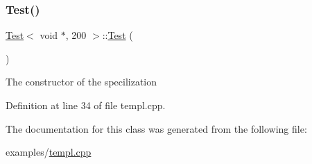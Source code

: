 \subsubsection{\texorpdfstring{Test()}{Test()}}
{\footnotesize\ttfamily \mbox{\hyperlink{class_test}{Test}}$<$ void $\ast$, 200 $>$\+::\mbox{\hyperlink{class_test}{Test}} (\begin{DoxyParamCaption}{ }\end{DoxyParamCaption})}

The constructor of the specilization 

Definition at line 34 of file templ.\+cpp.


\begin{DoxyCode}{0}

\end{DoxyCode}


The documentation for this class was generated from the following file\+:\begin{DoxyCompactItemize}
\item 
examples/\mbox{\hyperlink{templ_8cpp}{templ.\+cpp}}\end{DoxyCompactItemize}
